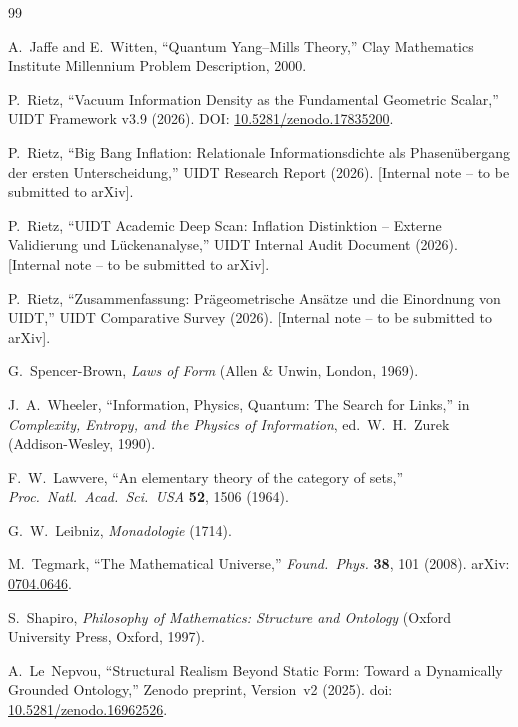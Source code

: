 \documentclass[12pt,a4paper,twoside]{article}
\theoremstyle{plain}
\theoremstyle{definition}
\theoremstyle{remark}
\begin{document}
\begin{thebibliography}{99}

A.~Jaffe and E.~Witten,
``Quantum Yang--Mills Theory,''
Clay Mathematics Institute Millennium Problem Description, 2000.

P.~Rietz,
``Vacuum Information Density as the Fundamental Geometric Scalar,''
UIDT Framework v3.9 (2026).
DOI: \href{https://doi.org/10.5281/zenodo.17835200}{10.5281/zenodo.17835200}.

P.~Rietz,
``Big Bang Inflation: Relationale Informationsdichte als Phasenübergang der
ersten Unterscheidung,''
UIDT Research Report (2026).
[Internal note – to be submitted to arXiv].

P.~Rietz,
``UIDT Academic Deep Scan: Inflation Distinktion – Externe Validierung und
Lückenanalyse,''
UIDT Internal Audit Document (2026).
[Internal note – to be submitted to arXiv].

P.~Rietz,
``Zusammenfassung: Prägeometrische Ansätze und die Einordnung von UIDT,''
UIDT Comparative Survey (2026).
[Internal note – to be submitted to arXiv].

G.~Spencer-Brown,
\emph{Laws of Form} (Allen \& Unwin, London, 1969).

J.~A.~Wheeler,
``Information, Physics, Quantum: The Search for Links,''
in \emph{Complexity, Entropy, and the Physics of Information},
ed.\ W.~H.~Zurek (Addison-Wesley, 1990).

F.~W.~Lawvere,
``An elementary theory of the category of sets,''
\emph{Proc.\ Natl.\ Acad.\ Sci.\ USA} \textbf{52}, 1506 (1964).

G.~W.~Leibniz,
\emph{Monadologie} (1714).

M.~Tegmark,
``The Mathematical Universe,''
\emph{Found.\ Phys.} \textbf{38}, 101 (2008).
arXiv: \href{https://arxiv.org/abs/0704.0646}{0704.0646}.

S.~Shapiro,
\emph{Philosophy of Mathematics: Structure and Ontology}
(Oxford University Press, Oxford, 1997).

A.~Le~Nepvou,
``Structural Realism Beyond Static Form:
Toward a Dynamically Grounded Ontology,''
Zenodo preprint, Version~v2 (2025).
doi: \href{https://doi.org/10.5281/zenodo.16962526}{10.5281/zenodo.16962526}.


\end{thebibliography}
\end{document}
